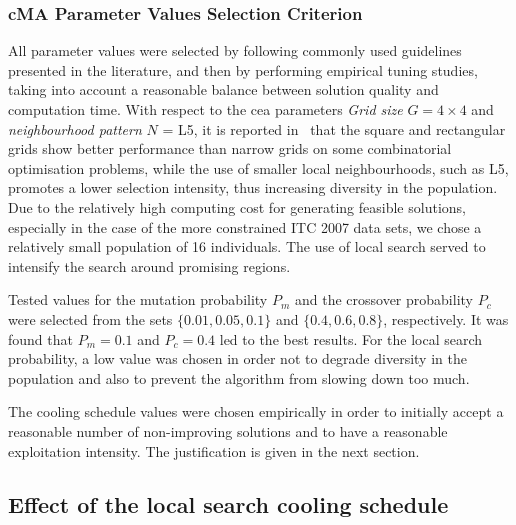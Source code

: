 %
%
\subsubsection{cMA Parameter Values Selection Criterion}

All parameter values were selected by following commonly used guidelines presented in the literature, and then by performing empirical tuning studies, taking into account a reasonable balance between solution quality and computation time. With respect to the \gls{cea} parameters \textit{Grid size} $G=4 \times 4$ and \textit{neighbourhood pattern} $N$ = L5, it is reported in~\cite{Alba2005a} that the square and rectangular grids show better performance than narrow grids on some combinatorial optimisation problems, while the use of smaller local neighbourhoods, such as L5, promotes a lower selection intensity, thus increasing diversity in the population. Due to the relatively high computing cost for generating feasible solutions, especially in the case of the more constrained ITC 2007 data sets, we chose a relatively small population of 16 individuals. The use of local search served to intensify the search around promising regions. 


Tested values for the mutation probability $P_m$ and the crossover probability $P_c$ were selected from the sets $\{0.01, 0.05, 0.1\}$ and $\{0.4, 0.6, 0.8\}$, respectively. It was found that $P_m=0.1$ and $P_c=0.4$ led to the best results. For the local search probability, a low value was chosen in order not to degrade diversity in the population and also to prevent the algorithm from slowing down too much.

The cooling schedule values were chosen empirically in order to initially accept a reasonable number of non-improving solutions and to have a reasonable exploitation intensity. The justification is given in the next section.



\subsection{Effect of the local search cooling schedule}
\label{sec:Chapter6_LocalSearchEffect}

